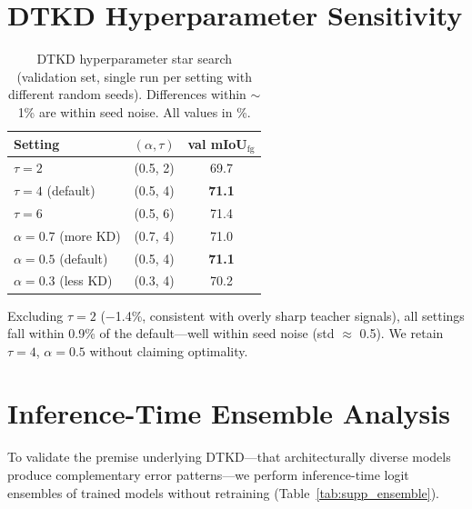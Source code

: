 \documentclass[review,authoryear]{elsarticle}
\begin{document}
\section{DTKD Hyperparameter Sensitivity}
\label{sec:supp_hyper}

\begin{table}[t]
\centering
\caption{DTKD hyperparameter star search (validation set, single run per setting with different random seeds). Differences within ${\sim}$1\% are within seed noise. All values in \%.}
\label{tab:supp_hyper}
\begin{tabular}{lcc}
\toprule
Setting & $(\alpha, \tau)$ & val mIoU$_{\text{fg}}$ \\
\midrule
$\tau{=}2$ & (0.5, 2) & 69.7 \\
$\tau{=}4$ (default) & (0.5, 4) & \textbf{71.1} \\
$\tau{=}6$ & (0.5, 6) & 71.4 \\
\midrule
$\alpha{=}0.7$ (more KD) & (0.7, 4) & 71.0 \\
$\alpha{=}0.5$ (default) & (0.5, 4) & \textbf{71.1} \\
$\alpha{=}0.3$ (less KD) & (0.3, 4) & 70.2 \\
\bottomrule
\end{tabular}
\end{table}

Excluding $\tau{=}2$ ($-$1.4\%, consistent with overly sharp teacher signals), all settings fall within 0.9\% of the default---well within seed noise (std $\approx$ 0.5). We retain $\tau{=}4$, $\alpha{=}0.5$ without claiming optimality.

\section{Inference-Time Ensemble Analysis}
\label{sec:supp_ensemble}

To validate the premise underlying DTKD---that architecturally diverse models produce complementary error patterns---we perform inference-time logit ensembles of trained models without retraining (Table~\ref{tab:supp_ensemble}).
\end{document}
